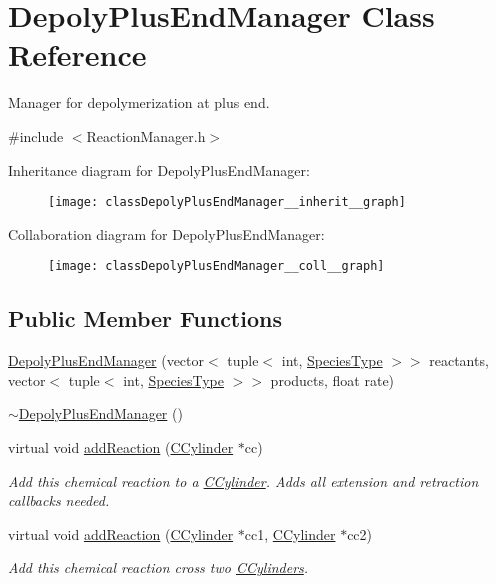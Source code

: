 \hypertarget{classDepolyPlusEndManager}{\section{Depoly\+Plus\+End\+Manager Class Reference}
\label{classDepolyPlusEndManager}
}


Manager for depolymerization at plus end.  




{\ttfamily \#include $<$Reaction\+Manager.\+h$>$}



Inheritance diagram for Depoly\+Plus\+End\+Manager\+:\nopagebreak
\begin{figure}[H]
\begin{center}
\leavevmode
\texttt{[image: classDepolyPlusEndManager\_\_inherit\_\_graph]}
\end{center}
\end{figure}


Collaboration diagram for Depoly\+Plus\+End\+Manager\+:
\nopagebreak
\begin{figure}[H]
\begin{center}
\leavevmode
\texttt{[image: classDepolyPlusEndManager\_\_coll\_\_graph]}
\end{center}
\end{figure}
\subsection*{Public Member Functions}
\begin{DoxyCompactItemize}
\item 
\hyperlink{classDepolyPlusEndManager_a928aca04c94403f31b60431c8b996847}{Depoly\+Plus\+End\+Manager} (vector$<$ tuple$<$ int, \hyperlink{Species_8h_a50651af47c56ea0e27235468d23542cf}{Species\+Type} $>$$>$ reactants, vector$<$ tuple$<$ int, \hyperlink{Species_8h_a50651af47c56ea0e27235468d23542cf}{Species\+Type} $>$$>$ products, float rate)
\item 
\hyperlink{classDepolyPlusEndManager_a262e63ed92a58c78205ac05b2b8fd1bf}{$\sim$\+Depoly\+Plus\+End\+Manager} ()
\item 
virtual void \hyperlink{classDepolyPlusEndManager_a2382f480f2ef9758533cd20cc0cfd0e5}{add\+Reaction} (\hyperlink{classCCylinder}{C\+Cylinder} $\ast$cc)
\begin{DoxyCompactList}\small\item\em Add this chemical reaction to a \hyperlink{classCCylinder}{C\+Cylinder}. Adds all extension and retraction callbacks needed. \end{DoxyCompactList}\item 
virtual void \hyperlink{classDepolyPlusEndManager_af3f3348ebf1d614dc9b1fcfe8282201f}{add\+Reaction} (\hyperlink{classCCylinder}{C\+Cylinder} $\ast$cc1, \hyperlink{classCCylinder}{C\+Cylinder} $\ast$cc2)
\begin{DoxyCompactList}\small\item\em Add this chemical reaction cross two \hyperlink{classCCylinder}{C\+Cylinders}. \end{DoxyCompactList}\end{DoxyCompactItemize}
